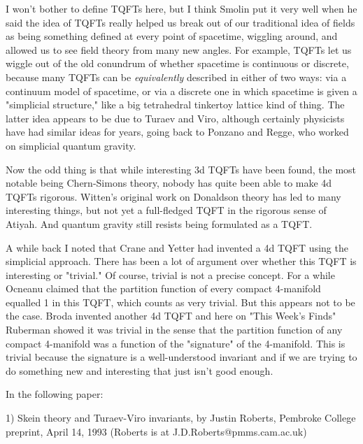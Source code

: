 I won't bother to define TQFTs here, but I think Smolin put it very well
when he said the idea of TQFTs really helped us break out of our
traditional idea of fields as being something defined at every point of
spacetime, wiggling around, and allowed us to see field theory from many
new angles.  For example, TQFTs let us wiggle out of the old conundrum
of whether spacetime is continuous or discrete, because many TQFTs can
be \emph{equivalently} described in either of two ways: via a continuum model
of spacetime, or via a discrete one in which spacetime is given a
"simplicial structure," like a big tetrahedral tinkertoy lattice kind of
thing.  The latter idea appears to be due to Turaev and Viro, although
certainly physicists have had similar ideas for years, going back to
Ponzano and Regge, who worked on simplicial quantum gravity.

Now the odd thing is that while interesting 3d TQFTs have been found,
the most notable being Chern-Simons theory, nobody has quite been able
to make 4d TQFTs rigorous.  Witten's original work on Donaldson theory
has led to many interesting things, but not yet a full-fledged TQFT in
the rigorous sense of Atiyah.  And quantum gravity still resists being
formulated as a TQFT.  

A while back I noted that Crane and Yetter had invented a 4d TQFT using
the simplicial approach.  There has been a lot of argument over whether
this TQFT is interesting or "trivial."  Of course, trivial is not a
precise concept.  For a while Ocneanu claimed that the partition
function of every compact 4-manifold equalled 1 in this TQFT, which
counts as very trivial.  But this appears not to be the case.  Broda
invented another 4d TQFT and here on "This Week's Finds" Ruberman showed
it was trivial in the sense that the partition function of any compact
4-manifold was a function of the "signature" of the 4-manifold.  This is
trivial because the signature is a well-understood invariant and if we
are trying to do something new and interesting that just isn't good enough.

In the following paper:

1) Skein theory and Turaev-Viro invariants, by Justin Roberts, Pembroke
College preprint, April 14, 1993 (Roberts is at J.D.Roberts@pmms.cam.ac.uk)

